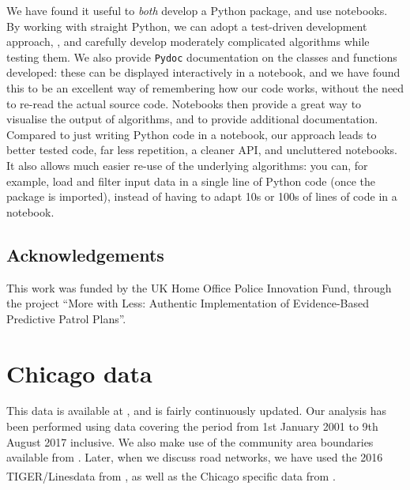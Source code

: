 \documentclass[twoside,a4paper,twocolumn,10pt]{article}
\theoremstyle{plain}
\theoremstyle{definition}
\newcommand{\regsym}{\textsuperscript{\textregistered}}
\begin{document}
We have found it useful to \emph{both} develop a Python package, and use notebooks.
By working with straight Python, we can adopt a test-driven development approach, \cite{beck},
and carefully develop moderately complicated algorithms while testing them.  We also provide
\texttt{Pydoc} documentation on the classes and functions developed: these can be displayed
interactively in a notebook, and we have found this to be an excellent way of remembering
how our code works, without the need to re-read the actual source code.  Notebooks then provide
a great way to visualise the output of algorithms, and to provide additional documentation.
Compared to just writing Python code in a notebook, our approach leads to better tested code,
far less repetition, a cleaner API, and uncluttered notebooks.  It also allows much easier
re-use of the underlying algorithms: you can, for example, load and filter input data in a
single line of Python code (once the package is imported), instead of having to adapt 10s
or 100s of lines of code in a notebook.



\subsection{Acknowledgements}

This work was funded by the UK Home Office Police Innovation Fund, through the
project ``More with Less: Authentic Implementation of Evidence-Based Predictive
Patrol Plans''.



\section{Chicago data}

This data is available at \cite{cdata}, and is fairly continuously updated.  Our analysis has been
performed using data covering the period from 1st January 2001 to 9th August 2017 inclusive.
We also make use of the community area boundaries available from \cite{cgeo}.  Later, when we discuss
road networks, we have used the 2016 TIGER/Lines\regsym data from \cite{tiger}, as well
as the Chicago specific data from \cite{cstreets}.
\end{document}
